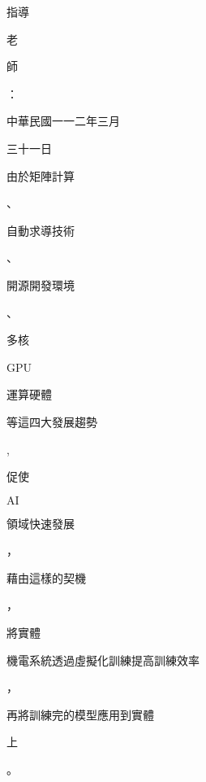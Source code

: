 \documentclass[10pt]{article}
\begin{document}
\begin{CJK}{UTF8}{mj}指導\end{CJK} \begin{CJK}{UTF8}{mj}老\end{CJK} \begin{CJK}{UTF8}{mj}師\end{CJK}：

\begin{CJK}{UTF8}{mj}中華民國一一二年三月\end{CJK} \begin{CJK}{UTF8}{mj}三十一日\end{CJK} \begin{CJK}{UTF8}{mj}由於矩陣計算\end{CJK}、\begin{CJK}{UTF8}{mj}自動求導技術\end{CJK}、\begin{CJK}{UTF8}{mj}開源開發環境\end{CJK}、\begin{CJK}{UTF8}{mj}多核\end{CJK}GPU\begin{CJK}{UTF8}{mj}運算硬體\end{CJK} \begin{CJK}{UTF8}{mj}等這四大發展趨勢\end{CJK}, \begin{CJK}{UTF8}{mj}促使\end{CJK} $\mathrm{AI}$ \begin{CJK}{UTF8}{mj}領域快速發展\end{CJK}，\begin{CJK}{UTF8}{mj}藉由這樣的契機\end{CJK}，\begin{CJK}{UTF8}{mj}將實體\end{CJK} \begin{CJK}{UTF8}{mj}機電系統透過虛擬化訓練提高訓練效率\end{CJK}，\begin{CJK}{UTF8}{mj}再將訓練完的模型應用到實體\end{CJK} \begin{CJK}{UTF8}{mj}上\end{CJK}。
\end{document}
